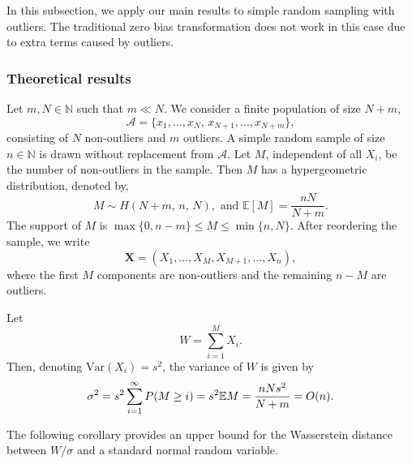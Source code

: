 \documentclass[pdflatex,sn-mathphys-ay]{sn-jnl}
\newcommand{\E}{\mathbb{E}}
\newcommand{\Var}{\mathrm{Var}}
\theoremstyle{thmstyleone}%
\theoremstyle{thmstyletwo}%
\theoremstyle{thmstylethree}%
\begin{document}

In this subsection, we apply our main results to simple random sampling with outliers. The traditional zero bias transformation does not work in this case due to extra terms caused by outliers.

\subsubsection{Theoretical results}
Let $m,N \in \mathbb{N}$ such that $m \ll N$. We consider a finite population of size $N+m$,
\[
\mathcal{A}=\{x_1,\dots,x_N,\,x_{N+1},\dots,x_{N+m}\},
\]
consisting of $N$ non-outliers and $m$ outliers. A simple random sample of size $n \in \mathbb{N}$ is drawn without replacement from $\mathcal{A}$. Let $M$, independent of all $X_i$, be the number of non-outliers in the sample. Then $M$ has a hypergeometric distribution, denoted by,
\[
M \sim H(N+m,\, n,\, N), \text{ and }
\mathbb{E}[M] = \frac{nN}{N+m}.
\]
The support of $M$ is $\max\{0,n-m\} \le M\le \min\{n,N\}$. After reordering the sample, we write
\[
\mathbf{X} = (X_1,\dots,X_M, X_{M+1},\dots,X_n),
\]
where the first $M$ components are non-outliers and the remaining $n-M$ are outliers.

Let
\[
W = \sum_{i=1}^{M} X_i.
\]
Then, denoting $\Var(X_i) = s^2$, the variance of $W$ is given by 	
\begin{align}\label{SRS:sigma}
\sigma^2=s^2\sum_{i=1}^\infty P(M\ge i)=s^2\E M={n Ns^2\over N+m}=O(n).
\end{align}



The following corollary provides an upper bound for the Wasserstein distance between $W/\sigma$ and a standard normal random variable. 
\end{document}
